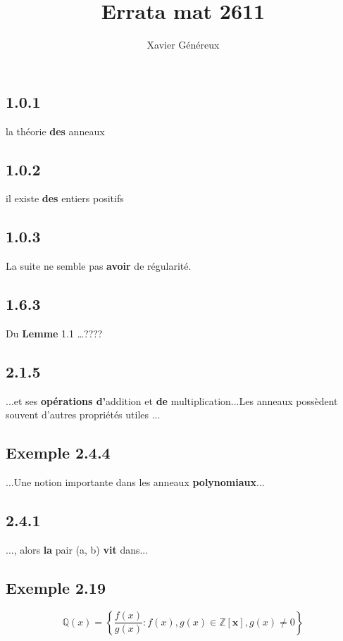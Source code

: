 \documentclass[11pt]{article}
\begin{document}
\title{Errata mat 2611}
\author{Xavier Généreux}
\maketitle


\subsection*{1.0.1}
la théorie \textbf{des} anneaux

\subsection*{1.0.2}
il existe \textbf{des} entiers positifs

\subsection*{1.0.3}

La suite ne semble pas \textbf{avoir} de régularité.

\subsection*{1.6.3}
Du \textbf{Lemme} 1.1 \dots????


\subsection*{2.1.5}
 ...et ses \textbf{opérations d'}addition et \textbf{de} multiplication...Les anneaux possèdent souvent d'autres propriétés utiles ...

\subsection*{Exemple 2.4.4}
...Une notion importante dans les anneaux \textbf{polynomiaux}...

\subsection*{2.4.1}
..., alors \textbf{la} pair (a, b) \textbf{vit} dans...

\subsection*{Exemple 2.19}
$$\mathbb{Q}(x) = \left\lbrace \frac{f(x)}{g(x)}:f(x),g(x)\in\pmb{\mathbb{Z}[x]},g(x) \neq 0\right\rbrace$$
\end{document}

